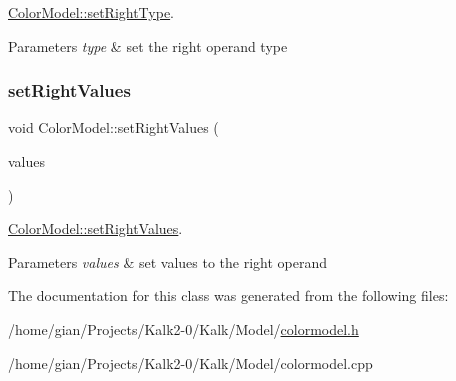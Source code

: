 \hyperlink{class_color_model_acad4c21bc8bcede62c821f6e87a44e38}{Color\+Model\+::set\+Right\+Type}. 


\begin{DoxyParams}{Parameters}
{\em type} & set the right operand type \\
\hline
\end{DoxyParams}
\mbox{\label{class_color_model_a07658db30b08f31f8f8190b6f4ed98d6}} 
\subsubsection{\texorpdfstring{set\+Right\+Values}{setRightValues}}
{\footnotesize\ttfamily void Color\+Model\+::set\+Right\+Values (\begin{DoxyParamCaption}\item[{Q\+Vector$<$ Q\+String $>$}]{values }\end{DoxyParamCaption})\hspace{0.3cm}{\ttfamily [slot]}}



\hyperlink{class_color_model_a07658db30b08f31f8f8190b6f4ed98d6}{Color\+Model\+::set\+Right\+Values}. 


\begin{DoxyParams}{Parameters}
{\em values} & set values to the right operand \\
\hline
\end{DoxyParams}


The documentation for this class was generated from the following files\+:\begin{DoxyCompactItemize}
\item 
/home/gian/\+Projects/\+Kalk2-\/0/\+Kalk/\+Model/\hyperlink{colormodel_8h}{colormodel.\+h}\item 
/home/gian/\+Projects/\+Kalk2-\/0/\+Kalk/\+Model/colormodel.\+cpp\end{DoxyCompactItemize}

